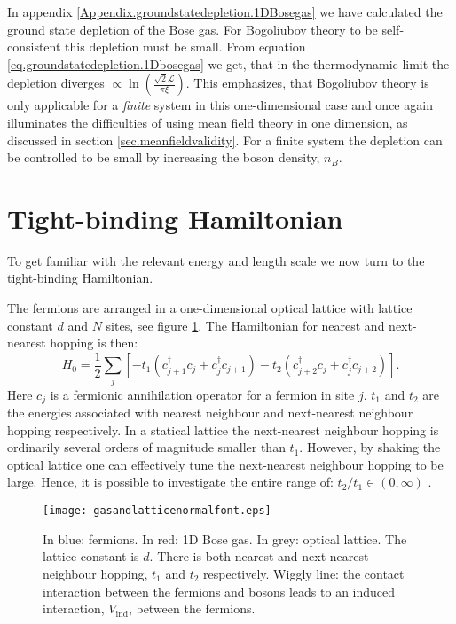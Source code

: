In appendix \ref{Appendix.groundstatedepletion.1DBosegas} we have calculated the ground state depletion of the Bose gas. For Bogoliubov theory to be self-consistent this depletion must be small. From equation \eqref{eq.groundstatedepletion.1Dbosegas} we get, that in the thermodynamic limit the depletion diverges $\propto \ln\left(\frac{\sqrt{2}\mathcal{L}}{\pi\xi} \right)$. This emphasizes, that Bogoliubov theory is only applicable for a \textit{finite} system in this one-dimensional case and once again illuminates the difficulties of using mean field theory in one dimension, as discussed in section \ref{sec.meanfieldvalidity}. For a finite system the depletion can be controlled to be small by increasing the boson density, $n_B$. 

\section{Tight-binding Hamiltonian} \label{sec.TightbindingHam.lattice}
To get familiar with the relevant energy and length scale we now turn to the tight-binding Hamiltonian.

The fermions are arranged in a one-dimensional optical lattice with lattice constant $d$ and $N$ sites, see figure \ref{fig.gasandlattice}. The Hamiltonian for nearest and next-nearest hopping is then:
\begin{equation}
H_{0} = \frac{1}{2}\sum_{j} \left[- t_1(c^\dagger_{j+1}c_j + c^\dagger_j c_{j + 1}) - t_2(c^\dagger_{j + 2}c_j + c^\dagger_j c_{j + 2}) \right].
\label{eq.Htightbindingrealspace} 
\end{equation}
Here $c_j$ is a fermionic annihilation operator for a fermion in site $j$. $t_1$ and $t_2$ are the energies associated with nearest neighbour and next-nearest neighbour hopping respectively. In a statical lattice the next-nearest neighbour hopping is ordinarily several orders of magnitude smaller than $t_1$. However, by shaking the optical lattice one can effectively tune the next-nearest neighbour hopping to be large. Hence, it is possible to investigate the entire range of: $t_2 / t_1 \in (0, \infty)$ \cite{Liberto.ShakingOpticalLattice}. 

\begin{figure}
\center
\texttt{[image: gasandlatticenormalfont.eps]}
\caption{In blue: fermions. In red: 1D Bose gas. In grey: optical lattice. The lattice constant is $d$. There is both nearest and next-nearest neighbour hopping, $t_1$ and $t_2$ respectively. Wiggly line: the contact interaction between the fermions and bosons leads to an induced interaction, $V_{\text{ind}}$, between the fermions. }
\label{fig.gasandlattice}
\end{figure}


